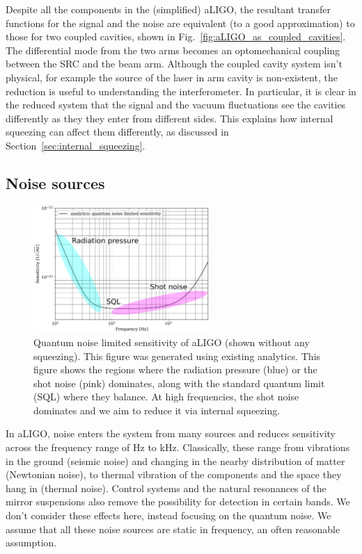 \documentclass[aps,pra,superscriptaddress,reprint,nofootinbib]{revtex4-1}
\begin{document}
Despite all the components in the (simplified) aLIGO, the resultant transfer functions for the signal and the noise are equivalent (to a good approximation) to those for two coupled cavities, shown in Fig.~\ref{fig:aLIGO_as_coupled_cavities}. The differential mode from the two arms becomes an optomechanical coupling between the SRC and the beam arm.
Although the coupled cavity system isn’t physical, for example the source of the laser in arm cavity is non-existent, the reduction is useful to understanding the interferometer. In particular, it is clear in the reduced system that the signal and the vacuum fluctuations see the cavities differently as they they enter from different sides. This explains how internal squeezing can affect them differently, as discussed in Section~\ref{sec:internal_squeezing}.


\subsection{Noise sources}
\label{sec:noise_sources}

\begin{figure}[ht]%
	\begin{center}
	\includegraphics[width=0.6\textwidth]{figures/sqz_aLIGO_analytics_quantum_noise_budget-labelled.pdf}
	\end{center}
	\caption{Quantum noise limited sensitivity of aLIGO (shown without any squeezing). This figure was generated using existing analytics. This figure shows the regions where the radiation pressure (blue) or the shot noise (pink) dominates, along with the standard quantum limit (SQL) where they balance. At high frequencies, the shot noise dominates and we aim to reduce it via internal squeezing.}
	\label{fig:sqz_aLIGO_analytics_quantum_noise_budget}
\end{figure}


In aLIGO, noise enters the system from many sources and reduces sensitivity across the frequency range of Hz to kHz. Classically, these range from vibrations in the ground (seismic noise) and changing in the nearby distribution of matter (Newtonian noise), to thermal vibration of the components and the space they hang in (thermal noise). Control systems and the natural resonances of the mirror suspensions also remove the possibility for detection in certain bands. We don’t consider these effects here, instead focusing on the quantum noise. We assume that all these noise sources are static in frequency, an often reasonable assumption. 
\end{document}

